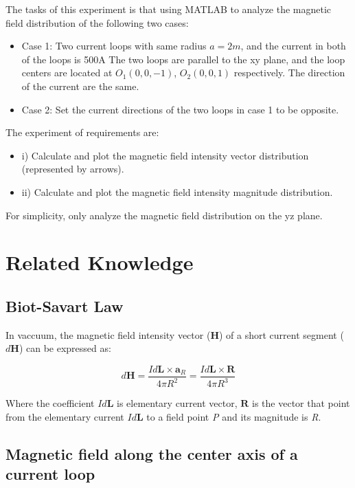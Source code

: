 \documentclass[10pt, journal, final]{IEEEtran}
\begin{document}
The tasks of this experiment is that using MATLAB
to analyze the magnetic field distribution of the following two cases:
\begin{itemize}
    \item Case 1: Two current loops with same radius $a = 2 m$, and the current in both of the loops is 500A
          The two loops are parallel to the xy plane, and the loop centers are located
          at $O_1(0,0,-1)$, $O_2(0,0,1)$ respectively. The direction of the current are the same.
    \item Case 2: Set the current directions of the two loops in case 1 to be opposite.
\end{itemize}
The experiment of requirements are:
\begin{itemize}
    \item i) Calculate and plot the magnetic field intensity vector distribution (represented by arrows).
    \item ii) Calculate and plot the magnetic field intensity magnitude distribution.
\end{itemize}
For simplicity, only analyze the magnetic field distribution on the yz plane.

\section{
  Related Knowledge
 }
\label{sec:Related}

\subsection{
    Biot-Savart Law
}
\label{subsec:Biot-Savart}
In vaccuum, the magnetic field intensity vector ($\mathbf{H}$)
of a short current segment ($d \mathbf{H}$) can be expressed as:

\begin{equation}
    d\mathbf{H} = \frac{I d\mathbf{L} \times \mathbf{a}_{R} }{4 \pi R^2}
    = \frac{I d\mathbf{L} \times \mathbf{R}}{4 \pi R^3}
\end{equation}

Where the coefficient $I d \mathbf{L}$ is elementary current vector,
$\mathbf{R}$ is the vector that point from the elementary current $I d \mathbf{L}$
to a field point \emph{P} and its magnitude is \emph{R}.\par

\subsection{
    Magnetic field along the center axis of a current loop
}
\label{subsec: center of loop}
\end{document}
